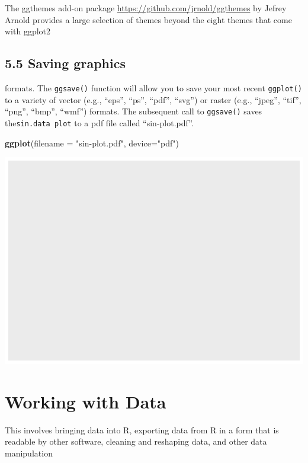 \documentclass[]{article}
\newenvironment{Shaded}{\begin{snugshade}}{\end{snugshade}}
\newcommand{\KeywordTok}[1]{\textcolor[rgb]{0.13,0.29,0.53}{\textbf{#1}}}
\newcommand{\DataTypeTok}[1]{\textcolor[rgb]{0.13,0.29,0.53}{#1}}
\newcommand{\StringTok}[1]{\textcolor[rgb]{0.31,0.60,0.02}{#1}}
\newcommand{\NormalTok}[1]{#1}
\begin{document}
The ggthemes add-on package \url{https://github.com/jrnold/ggthemes} by
Jefrey Arnold provides a large selection of themes beyond the eight
themes that come with ggplot2

\subsection{5.5 Saving graphics}\label{saving-graphics}

formats. The \texttt{ggsave()} function will allow you to save your most
recent \texttt{ggplot()} to a variety of vector (e.g., ``eps'', ``ps'',
``pdf'', ``svg'') or raster (e.g., ``jpeg'', ``tif'', ``png'', ``bmp'',
``wmf'') formats. The subsequent call to \texttt{ggsave()} saves
the\texttt{sin.data\ plot} to a pdf file called ``sin-plot.pdf''.

\begin{Shaded}
\begin{Highlighting}[]
\KeywordTok{ggplot}\NormalTok{(}\DataTypeTok{filename =} \StringTok{"sin-plot.pdf"}\NormalTok{, }\DataTypeTok{device=}\StringTok{"pdf"}\NormalTok{)}
\end{Highlighting}
\end{Shaded}

\includegraphics{stt-301-programming_files/figure-latex/unnamed-chunk-76-1.pdf}

\section{Working with Data}\label{working-with-data}

This involves bringing data into R, exporting data from R in a form that
is readable by other software, cleaning and reshaping data, and other
data manipulation
\end{document}
